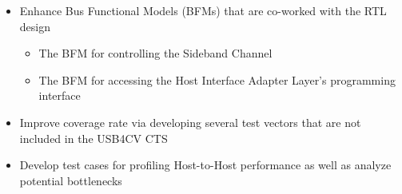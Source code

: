 \documentclass{cvclass}
\begin{document}
{\begin{itemize}
\begin{itemize}
\begin{itemize}
\begin{itemize}
                    \item Operation with Re-timers placed on a Link (up to six Re-timers)
                \end{itemize}
                \item USB4\texttrademark{} Protocol Compliance Test Specification Revision 1.10
                \begin{itemize}
                    \item The Header Error Control (HEC) and the Error Correction Code (ECC) in a Transport Layer Packet
                    \item Several Flow Control (FC) schemes including Dedicated FC and Shared FC
                    \item Path Configuration including setup and teardown 
                \end{itemize}
            \end{itemize}
            \item Enhance Bus Functional Models (BFMs) that are co-worked with the RTL design
            \begin{itemize}
                \item The BFM for controlling the Sideband Channel
                \item The BFM for accessing the Host Interface Adapter Layer's programming interface
            \end{itemize}
            \item Improve coverage rate via developing several test vectors that are not included in the USB4CV CTS
            \item Develop test cases for profiling Host-to-Host performance as well as analyze potential bottlenecks
        \end{itemize}
    \end{itemize}}
\end{document}
